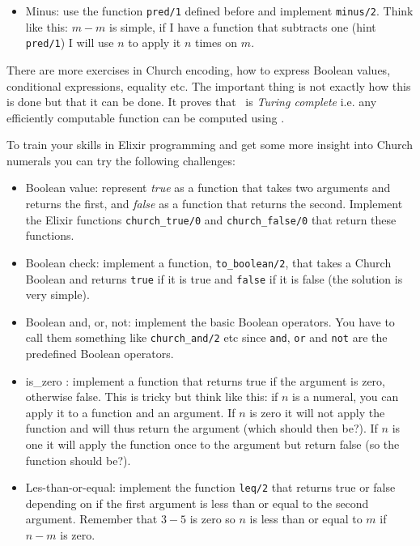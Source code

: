 \documentclass[a4paper,11pt]{article}
\begin{document}
\begin{itemize}
\item Minus: use the function {\tt pred/1} defined before and
  implement {\tt minus/2}. Think like this: $m - m$ is simple, if I
  have a function that subtracts one (hint {\tt pred/1}) I will use
    $n$ to apply it $n$ times on $m$. 
\end{itemize}

There are more exercises in Church encoding, how to express Boolean
values, conditional expressions, equality etc. The important thing is
not exactly how this is done but that it can be done. It proves that
\lamc\ is {\em Turing complete} i.e. any efficiently computable
function can be computed using \lamc.

To train your skills in Elixir programming and get some
more insight into Church numerals you can try the following challenges:

\begin{itemize}

\item Boolean value: represent {\em true} as a function that takes two
  arguments and returns the first, and {\em false} as a function that
  returns the second.  Implement the Elixir functions {\tt church_true/0} and
  {\tt church_false/0} that return these functions.
  
\item Boolean check: implement a function, {\tt to_boolean/2},  that takes a Church Boolean
  and returns {\tt true} if it is true and {\tt false} if it is false
  (the solution is very simple).
  
\item Boolean and, or, not: implement the basic Boolean operators. You have to
  call them something like {\tt church_and/2} etc since {\tt and},
  {\tt or} and {\tt not} are the predefined Boolean operators.

\item is_zero : implement a function that returns true if the argument
  is zero, otherwise false. This is tricky but think like this: if $n$
  is a numeral, you can apply it to a function and an argument. If $n$ is
  zero it will not apply the function and will thus return the
  argument (which should then be?). If $n$ is one it will apply the
  function once to the argument but return false (so the function should be?).

\item Les-than-or-equal: implement the function {\tt leq/2} that
  returns true or false depending on if the first argument is less
  than or equal to the second argument. Remember that $3-5$ is zero so
  $n$ is less than or equal to $m$ if $n - m$ is zero.
\end{itemize}
\end{document}
